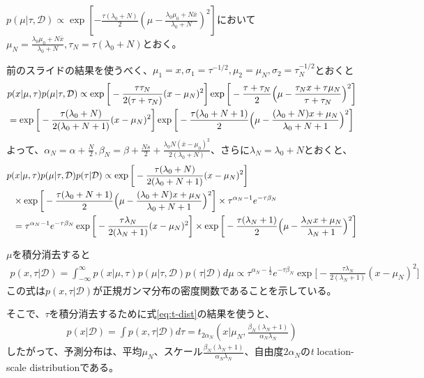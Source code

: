\documentclass[aspectratio=169,unicode,dvipdfmx,14pt]{beamer}
\begin{document}
\begin{frame}
\FontMath
$p(\mu|\tau,\mathcal{D}) \propto \exp [ - \frac{\tau( \lambda_0 + N )}{2}  ( \mu - \frac{ \lambda_0 \mu_0 + N\bar{x} }{ \lambda_0 + N } )^2 ]$において$\mu_N = \frac{ \lambda_0 \mu_0 + N\bar{x} }{ \lambda_0 + N }, \tau_N = \tau(\lambda_0 + N)$とおく。

前のスライドの結果を使うべく、$\mu_1 = x, \sigma_1 = \tau^{-1/2}, \mu_2 = \mu_N, \sigma_2 = \tau_N^{-1/2}$とおくと
\begin{align}
& p(x|\mu,\tau) p(\mu|\tau,\mathcal{D})
\propto
\exp\bigg[ - \frac{ \tau\tau_N }{2(\tau + \tau_N)} (x - \mu_N)^2 \bigg]
\exp\bigg[ - \frac{ \tau + \tau_N }{2} \Big(\mu - \frac{ \tau_N x + \tau \mu_N }{ \tau + \tau_N }\Big)^2 \bigg]
\notag \\ & =
\exp\bigg[ - \frac{ \tau( \lambda_0 + N ) }{2(\lambda_0 + N + 1)} (x - \mu_N)^2 \bigg]
\exp\bigg[ - \frac{ \tau( \lambda_0 + N + 1 ) }{2} \Big(\mu - \frac{ ( \lambda_0 + N ) x + \mu_N }{ \lambda_0 + N + 1 }\Big)^2 \bigg]
\end{align}
よって、$\alpha_N=\alpha+\frac{N}{2}, \beta_N = \beta + \frac{Ns}{2} + \frac{ \lambda_0 N (\bar{x} - \mu_0)^2 }{ 2( \lambda_0 + N ) }$、さらに$\lambda_N = \lambda_0 + N$とおくと、
\begin{align}
& p(x|\mu,\tau) p(\mu|\tau,\mathcal{D})p(\tau|\mathcal{D})
\propto
\exp\bigg[ - \frac{ \tau( \lambda_0 + N ) }{2(\lambda_0 + N + 1)} (x - \mu_N)^2 \bigg]
\notag \\ & \mbox{ \ } \times
\exp\bigg[ - \frac{ \tau( \lambda_0 + N + 1 ) }{2} \Big(\mu - \frac{ ( \lambda_0 + N ) x + \mu_N }{ \lambda_0 + N + 1 }\Big)^2 \bigg] \times
\tau^{\alpha_N - 1} e^{ - \tau \beta_N }
\notag \\ & \mbox{ \ } = \tau^{\alpha_N - 1} e^{ - \tau \beta_N }
\exp\bigg[ - \frac{ \tau \lambda_N }{2(\lambda_N + 1)} (x - \mu_N)^2 \bigg]
\times \exp\bigg[ - \frac{ \tau( \lambda_N + 1 ) }{2} \Big(\mu - \frac{ \lambda_N x + \mu_N }{ \lambda_N + 1 }\Big)^2 \bigg]
\end{align}
\end{frame}

\begin{frame}
\FontMath
$\mu$を積分消去すると
\begin{align}
p(x, \tau|\mathcal{D})
= \int_{-\infty}^\infty p(x|\mu,\tau) p(\mu|\tau,\mathcal{D})p(\tau|\mathcal{D}) d\mu
\propto
\tau^{\alpha_N - \frac{1}{2}}
e^{ - \tau \beta_N } \exp\bigg[ - \frac{ \tau \lambda_N }{2(\lambda_N + 1)} (x - \mu_N)^2 \bigg]
\end{align}
この式は$p(x, \tau|\mathcal{D})$が正規ガンマ分布の密度関数であることを示している。

そこで、$\tau$を積分消去するために式\eqref{eq:t-dist}の結果を使うと、
\begin{align}
p(x|\mathcal{D}) = \int p(x, \tau|\mathcal{D}) d\tau
= t_{2\alpha_N} ( x | \mu_N, \frac{\beta_N(\lambda_N + 1)}{\alpha_N\lambda_N} ) 
\end{align}
したがって、予測分布は、平均$\mu_N$、スケール$\frac{\beta_N(\lambda_N + 1)}{\alpha_N\lambda_N}$、自由度$2\alpha_N$の\textit{t} location-scale distributionである。
\end{frame}
\end{document}
